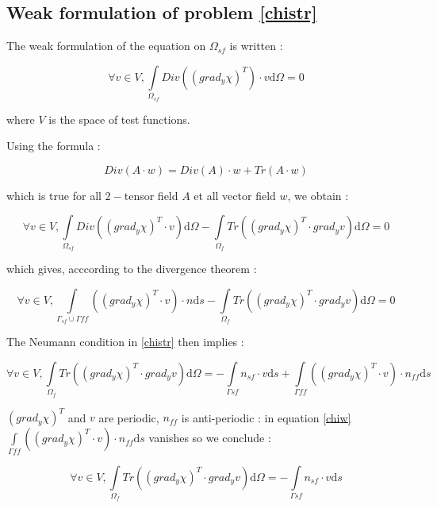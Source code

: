 \subsection{Weak formulation of problem \ref{chistr}}

The weak formulation of the equation on $\Omega_{sf}$ is written :

\[\forall v \in V , \int\limits_{\Omega_{sf}}Div\left(\left(grad_y \chi\right)^{T}\right)\cdot v\text{d}\Omega=0\]

where $V$ is the space of test functions.

\par
Using the formula :

\[Div(A\cdot w)=Div(A)\cdot w+Tr(A\cdot w)\]

which is true for all $2-$tensor field $A$ et all vector field $w$, we obtain :

\[\forall v \in V , \int\limits_{\Omega_{sf}}Div\left(\left(grad_y \chi\right)^{T}\cdot v\right)\text{d}\Omega-%
\int\limits_{\Omega_f}Tr\left(\left(grad_y\chi\right)^T\cdot grad_y v\right)\text{d}\Omega=0\]

which gives, acccording to the divergence theorem :

\[\forall v \in V , \int\limits_{\Gamma_{sf}\cup\Gamma{ff}}\left(\left(grad_y \chi\right)^{T}\cdot v\right)\cdot n\text{d}s-%
\int\limits_{\Omega_f}Tr\left(\left(grad_y\chi\right)^T\cdot grad_y v\right)\text{d}\Omega=0\]

The Neumann condition in \ref{chistr} then implies :

\begin{equation}\label{chiw}
\forall v \in V , %
\int\limits_{\Omega_f}Tr\left(\left(grad_y\chi\right)^T\cdot grad_y v\right)\text{d}\Omega=%
-\int\limits_{\Gamma{sf}}n_{sf}\cdot v\text{d}s%
+\int\limits_{\Gamma{ff}}\left(\left(grad_y \chi\right)^{T}\cdot v\right)\cdot n_{ff}\text{d}s
\end{equation}

$\left(grad_y \chi\right)^{T}$ and $v$ are periodic, $n_{ff}$ is anti-periodic : %
in equation \ref{chiw} $\displaystyle\int\limits_{\Gamma{ff}}\left(\left(grad_y \chi\right)^{T}\cdot v\right)\cdot n_{ff}\text{d}s$ vanishes so we conclude :

\begin{equation}\label{chiwper}
\forall v \in V , %
\int\limits_{\Omega_f}Tr\left(\left(grad_y\chi\right)^T\cdot grad_y v\right)\text{d}\Omega=%
-\int\limits_{\Gamma{sf}}n_{sf}\cdot v\text{d}s
\end{equation}

